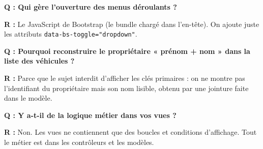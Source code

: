 \documentclass[11pt,a4paper]{article}
\newcommand{\question}[1]{\vspace{0.4em}\noindent\textbf{\color{rouge}Q : #1}\par}
\newcommand{\reponse}[1]{\noindent\textbf{R :} #1\par\vspace{0.4em}}
\begin{document}
\question{Qui gère l'ouverture des menus déroulants ?}
\reponse{Le JavaScript de Bootstrap (le bundle chargé dans l'en-tête). On ajoute
juste les attributs \texttt{data-bs-toggle="dropdown"}.}

\question{Pourquoi reconstruire le propriétaire « prénom + nom » dans la liste des
véhicules ?}
\reponse{Parce que le sujet interdit d'afficher les clés primaires : on ne montre
pas l'identifiant du propriétaire mais son nom lisible, obtenu par une jointure
faite dans le modèle.}

\question{Y a-t-il de la logique métier dans vos vues ?}
\reponse{Non. Les vues ne contiennent que des boucles et conditions d'affichage.
Tout le métier est dans les contrôleurs et les modèles.}
\end{document}
